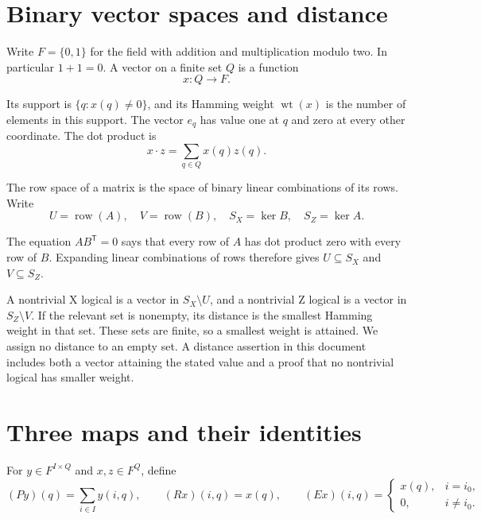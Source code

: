 \documentclass{article}
\DeclareMathOperator{\wt}{wt}
\DeclareMathOperator{\rowsp}{row}
\begin{document}
\section{Binary vector spaces and distance}\label{sec:binary}

Write \(F=\{0,1\}\) for the field with addition and multiplication modulo
two. In particular \(1+1=0\). A vector on a finite set \(Q\) is a function
\begin{equation}\label{eq:vector}
x:Q\longrightarrow F.
\end{equation}

Its support is \(\{q:x(q)\ne0\}\), and its Hamming weight \(\wt(x)\)
is the number of elements in this support. The vector \(e_q\) has value one
at \(q\) and zero at every other coordinate. The dot product is
\begin{equation}\label{eq:dot}
x\cdot z=\sum_{q\in Q}x(q)z(q).
\end{equation}

The row space of a matrix is the space of binary linear combinations of
its rows. Write
\begin{equation}\label{eq:spaces}
U=\rowsp(A),\quad V=\rowsp(B),\quad
S_X=\ker B,\quad S_Z=\ker A.
\end{equation}

The equation \(AB^{\mathsf T}=0\) says that every row of \(A\) has dot
product zero with every row of \(B\). Expanding linear combinations of
rows therefore gives \(U\subseteq S_X\) and \(V\subseteq S_Z\).

A nontrivial X logical is a vector in \(S_X\setminus U\), and a nontrivial
Z logical is a vector in \(S_Z\setminus V\). If the relevant set is
nonempty, its distance is the smallest Hamming weight in that set.
These sets are finite, so a smallest weight is attained. We assign no
distance to an empty set. A distance assertion in this document includes
both a vector attaining the stated value and a proof that no nontrivial
logical has smaller weight.

\section{Three maps and their identities}\label{sec:maps}

For \(y\in F^{I\times Q}\) and \(x,z\in F^Q\), define
\begin{equation}\label{eq:maps}
(Py)(q)=\sum_{i\in I}y(i,q),\qquad
(Rx)(i,q)=x(q),\qquad
(Ex)(i,q)=
\begin{cases}
x(q),&i=i_0,\\
0,&i\ne i_0.
\end{cases}
\end{equation}
\end{document}

